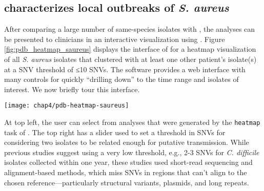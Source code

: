 \subsection{\pathogendbviz{} characterizes local outbreaks of \emph{S. aureus}}

After comparing a large number of same-species isolates with \pathogendbcomparison{}, the analyses can be presented to clinicians in an interactive visualization using \pathogendbviz. Figure \ref{fig:pdb_heatmap_saureus} displays the interface of \pathogendbviz{} for a heatmap visualization of all \emph{S. aureus} isolates that clustered with at least one other patient's isolate(s) at a SNV threshold of ≤10 SNVs. The software provides a web interface with many controls for quickly ``drilling down'' to the time range and isolates of interest. We now briefly tour this interface.

\begin{sidewaysfigure}[hp]
  \sidewaysvspace
  \centering
  \texttt{[image: chap4/pdb-heatmap-saureus]}               
\end{sidewaysfigure}

At top left, the user can select from analyses that were generated by the \verb|heatmap| task of \pathogendbcomparison. The top right has a slider used to set a threshold in SNVs for considering two isolates to be related enough for putative transmission. While previous studies suggest using a very low threshold, e.g., 2-3 SNVs for \emph{C. difficile} isolates collected within one year,\autocite{Eyre2013,Price2014,Eyre2012} these studies used short-read sequencing and alignment-based methods, which miss SNVs in regions that can't align to the chosen reference—particularly structural variants, plasmids, and long repeats. 

